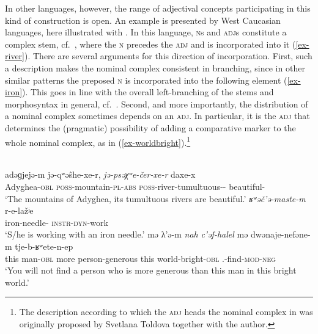 \documentclass[output=paper,nobabel,draftmode  ,colorlinks, citecolor=brown]{langscibook}
\begin{document}
\largerpage[-1]
In other languages, however, the range of adjectival concepts participating in this kind of construction is open. An example is presented by West Caucasian languages, here illustrated with . In this language, \textsc{n}s and \textsc{adj}s constitute a complex stem, cf.\ \citet{Lander2017}, where the \textsc{n} precedes the \textsc{adj}  and is incorporated into it (\ref{ex-river}). There are several arguments for this direction of incorporation. First, such a description makes the nominal complex consistent in branching, since in other similar patterns the preposed \textsc{n} is incorporated into the following element (\ref{ex-iron}). This goes in line with the overall left-branching of the  stems and morphosyntax in general, cf.\ \citet{KorotkovaLander2010}.  
Second, and more importantly, the distribution of a nominal complex sometimes depends on an \textsc{adj}. In particular, it is the \textsc{adj} that determines the (pragmatic) possibility of adding a comparative marker to the whole nominal complex, as in (\ref{ex-worldbright}).\footnote{The description according to which the \textsc{adj} heads the nominal complex in  was originally proposed by Svetlana Toldova together with the author.}

\newpage
\ea
{}\\
\ea
\label{ex-river}	
\gll adəɡjejə-m	    jə-qʷəŝhe-xe-r,    \emph{jə-psəχʷe-čer-xe-r}   		daxe-x\\
     Adyghea-\textsc{obl}   \textsc{poss}-mountain-\textsc{pl}-\textsc{abs} \textsc{poss}-river-tumultuous-\PL-\ABS{}	beautiful-\PL\\
\glt `The mountains of Adyghea, its tumultuous rivers are 	beautiful.'
\ex\label{ex-iron}
\gll	\emph{ʁʷəč’ə-maste-m}	r-e-lažʲe\\
		iron-needle-\OBL{}	\textsc{instr}-\textsc{dyn}-work\\
\glt `S/he is working with an iron needle.'
\ex\label{ex-worldbright}
\gll	mə	λ’ə-m	\emph{nah}	\emph{c’əf-halel}	mə	dwənaje-nefəne-m      		tje-b-ʁʷete-n-ep\\
	this	man-\textsc{obl} more	person-generous	this	world-bright-\textsc{obl}		\SG.\ERG-find-\textsc{mod}-\textsc{neg}\\
\glt `You will not find a person who is more generous than this man in this bright world.'

\z
\z
\end{document}
